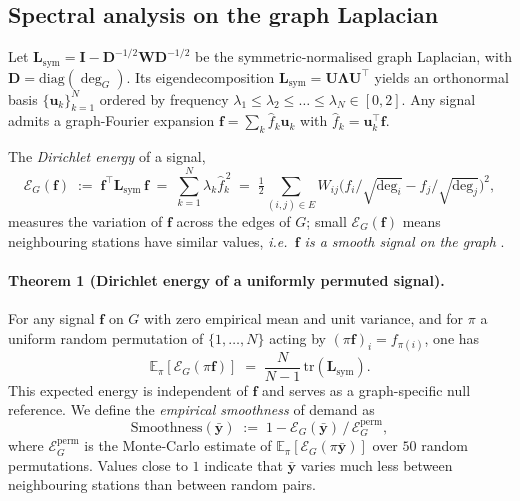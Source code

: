 \subsection{Spectral analysis on the graph Laplacian}

Let
$\mathbf{L}_{\mathrm{sym}} = \mathbf{I} - \mathbf{D}^{-1/2} \mathbf{W} \mathbf{D}^{-1/2}$
be the symmetric-normalised graph Laplacian, with
$\mathbf{D} = \mathrm{diag}(\deg_G)$.  Its eigendecomposition
$\mathbf{L}_{\mathrm{sym}} = \mathbf{U} \boldsymbol{\Lambda} \mathbf{U}^{\top}$
yields an orthonormal basis $\{ \mathbf{u}_k \}_{k=1}^{N}$
ordered by frequency $\lambda_1 \leq \lambda_2 \leq \dots \leq
\lambda_N \in [0, 2]$.  Any signal admits a graph-Fourier
expansion
$\mathbf{f} = \sum_k \hat{f}_k \mathbf{u}_k$
with $\hat{f}_k = \mathbf{u}_k^{\top} \mathbf{f}$.

The \emph{Dirichlet energy} of a signal,
\begin{equation}
    \mathcal{E}_G(\mathbf{f}) \;:=\; \mathbf{f}^{\top} \mathbf{L}_{\mathrm{sym}}\, \mathbf{f}
    \;=\; \sum_{k=1}^{N} \lambda_k \hat{f}_k^{\,2}
    \;=\; \tfrac{1}{2} \sum_{(i,j) \in E} W_{ij} \bigl( f_i / \sqrt{\deg_i} - f_j / \sqrt{\deg_j} \bigr)^2,
    \label{eq:dirichlet}
\end{equation}
measures the variation of $\mathbf{f}$ across the edges of $G$;
small $\mathcal{E}_G(\mathbf{f})$ means neighbouring stations
have similar values, \emph{i.e.\ $\mathbf{f}$ is a smooth signal
on the graph} \citep{Shuman2013}.

\paragraph{Theorem 1 (Dirichlet energy of a uniformly permuted
signal).}
For any signal $\mathbf{f}$ on $G$ with zero empirical mean and
unit variance, and for $\pi$ a uniform random permutation of
$\{1, \dots, N\}$ acting by
$(\pi \mathbf{f})_i = f_{\pi(i)}$, one has
\begin{equation}
    \mathbb{E}_\pi\!\left[ \mathcal{E}_G(\pi \mathbf{f}) \right]
    \;=\; \frac{N}{N - 1} \, \mathrm{tr}(\mathbf{L}_{\mathrm{sym}}).
\end{equation}
This expected energy is independent of $\mathbf{f}$ and serves
as a graph-specific null reference.  We define the
\emph{empirical smoothness} of demand as
\begin{equation}
    \mathrm{Smoothness}(\bar{\mathbf{y}}) \;:=\;
    1 - \mathcal{E}_G(\bar{\mathbf{y}}) \,/\, \mathcal{E}_G^{\mathrm{perm}},
    \label{eq:smoothness-def}
\end{equation}
where $\mathcal{E}_G^{\mathrm{perm}}$ is the Monte-Carlo estimate
of $\mathbb{E}_\pi[\mathcal{E}_G(\pi \bar{\mathbf{y}})]$ over
$50$ random permutations.  Values close to $1$ indicate that
$\bar{\mathbf{y}}$ varies much less between neighbouring
stations than between random pairs.

